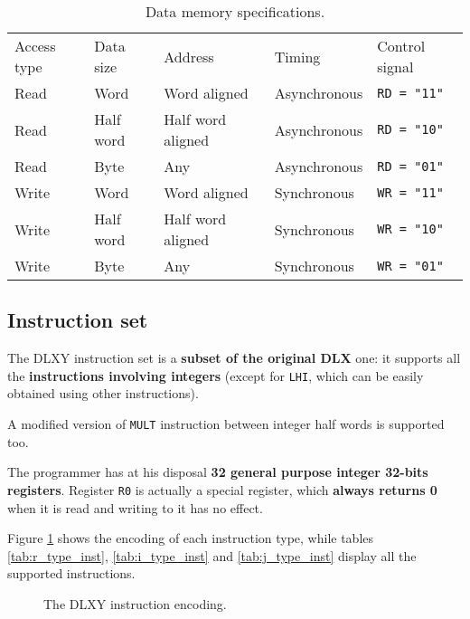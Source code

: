 \begin{table}[H]
	\centering
	\begin{tabular}{lllll}
		\hline
		\rowcolor{gray!50}
		Access type & Data size & Address & Timing & Control signal \\
		Read & Word & Word aligned & Asynchronous & \texttt{RD = "11"} \\
		\rowcolor{gray!25}
		Read & Half word & Half word aligned & Asynchronous & \texttt{RD = "10"} \\
		Read & Byte & Any & Asynchronous & \texttt{RD = "01"} \\
		\rowcolor{gray!25}
		Write & Word & Word aligned & Synchronous & \texttt{WR = "11"} \\
		Write & Half word & Half word aligned & Synchronous & \texttt{WR = "10"} \\
		\rowcolor{gray!25}
		Write & Byte & Any & Synchronous & \texttt{WR = "01"} \\
		\hline
	\end{tabular}
	\caption{Data memory specifications.}
	\label{tab:d_mem_specs}
\end{table}

\subsection{Instruction set}
The DLXY instruction set is a \textbf{subset of the original DLX} one:
it supports all the \textbf{instructions involving integers} (except for
\texttt{LHI}, which can be easily obtained using other instructions).

A modified version of \texttt{MULT} instruction between integer half words is
supported too.

\bigskip
The programmer has at his disposal \textbf{32 general purpose integer 32-bits registers}.
Register \texttt{R0} is actually a special register, which \textbf{always returns 0}
when it is read and writing to it has no effect.

\bigskip
Figure \ref{fig:encoding} shows the encoding of each instruction type, while
tables \ref{tab:r_type_inst}, \ref{tab:i_type_inst} and \ref{tab:j_type_inst}
display all the supported instructions.

\begin{figure}[H]
	\centering
	\caption{The DLXY instruction encoding.}
	\label{fig:encoding}
\end{figure}

